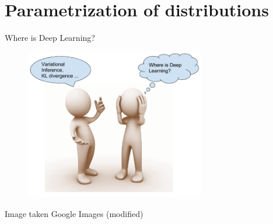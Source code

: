 \documentclass{beamer}
\begin{document}

\section{Parametrization of distributions}

\begin{frame}{Where is Deep Learning?}

    \begin{figure}
        \centering
        \includegraphics[width=0.7\textwidth]{where_is_deep_learning}
        \label{fig:where_is_deep_learning}
    \end{figure}
    {\small Image taken Google Images (modified)}
\end{frame}
\end{document}
